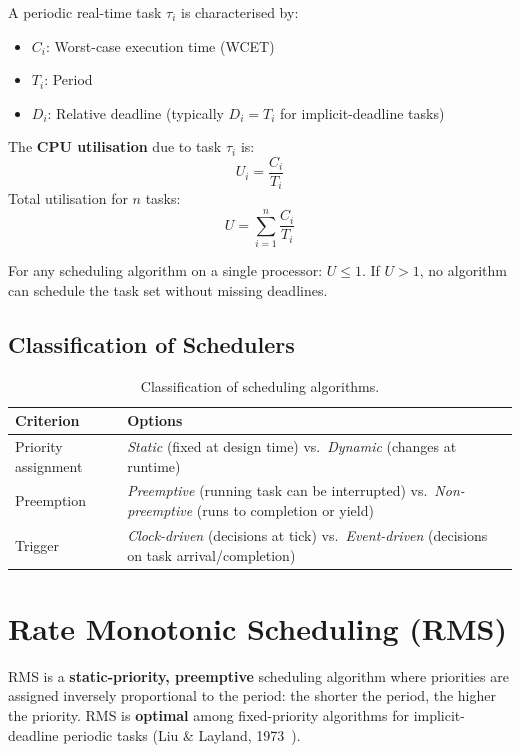 A periodic real-time task $\tau_i$ is characterised by:
\begin{itemize}[nosep]
  \item $C_i$: Worst-case execution time (WCET)
  \item $T_i$: Period
  \item $D_i$: Relative deadline (typically $D_i = T_i$ for implicit-deadline tasks)
\end{itemize}

The \textbf{CPU utilisation} due to task $\tau_i$ is:
\[
U_i = \frac{C_i}{T_i}
\]
Total utilisation for $n$ tasks:
\[
U = \sum_{i=1}^{n} \frac{C_i}{T_i}
\]

\begin{important}
For any scheduling algorithm on a single processor: $U \leq 1$. If $U > 1$, no algorithm can schedule the task set without missing deadlines.
\end{important}

\subsection{Classification of Schedulers}

\begin{table}[H]
\centering
\caption{Classification of scheduling algorithms.}
\label{tab:sched:class}
\begin{tabularx}{\linewidth}{@{}lX@{}}
\toprule
\textbf{Criterion} & \textbf{Options} \\
\midrule
Priority assignment & \emph{Static} (fixed at design time) vs.\ \emph{Dynamic} (changes at runtime) \\
Preemption & \emph{Preemptive} (running task can be interrupted) vs.\ \emph{Non-preemptive} (runs to completion or yield) \\
Trigger & \emph{Clock-driven} (decisions at tick) vs.\ \emph{Event-driven} (decisions on task arrival/completion) \\
\bottomrule
\end{tabularx}
\end{table}

\section{Rate Monotonic Scheduling (RMS)}
\label{sec:sched:rms}

\begin{definition}
RMS is a \textbf{static-priority, preemptive} scheduling algorithm where priorities are assigned inversely proportional to the period: the shorter the period, the higher the priority. RMS is \textbf{optimal} among fixed-priority algorithms for implicit-deadline periodic tasks (Liu \& Layland, 1973~\cite{liu1973}).
\end{definition}

